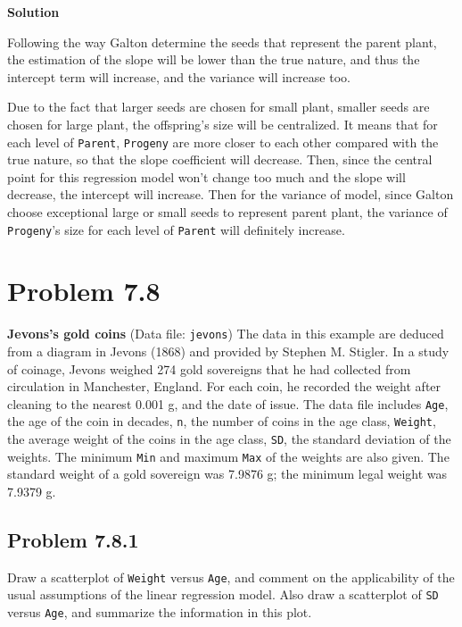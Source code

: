 \documentclass[12pt,oneside,a4paper]{article}\usepackage[]{graphicx}\usepackage[]{xcolor}
\newcommand{\problem}[1]
{
    \clearpage
    \section*{Problem {#1}}
}
\newcommand{\subproblem}[1]
{
    \subsection*{Problem {#1}}
}
\newcommand{\solution}
{
    \vspace{15pt}
    \noindent\ignorespaces\textbf{\large Solution}\par
}
\newcommand{\m}[1]{\texttt{{#1}}}
\begin{document}
\solution
Following the way Galton determine the seeds that represent the parent plant, the estimation of the slope will be lower than the true nature, and thus the intercept term will increase, and the variance will increase too. 

Due to the fact that larger seeds are chosen for small plant, smaller seeds are chosen for large plant, the offspring's size will be centralized. It means that for each level of \m{Parent}, \m{Progeny} are more closer to each other compared with the true nature, so that the slope coefficient will decrease. Then, since the central point for this regression model won't change too much and the slope will decrease, the intercept will increase. Then for the variance of model, since Galton choose exceptional large or small seeds to represent parent plant, the variance of \m{Progeny}'s size for each level of \m{Parent} will definitely increase. 

\problem{7.8}
\textbf{Jevons’s gold coins} (Data file: \m{jevons}) The data in this example are deduced from a diagram in Jevons (1868) and provided by Stephen M. Stigler. In a study of coinage, Jevons weighed 274 gold sovereigns that he had collected from circulation in Manchester, England. For each coin, he recorded the weight after cleaning to the nearest 0.001 g, and the date of issue. The data file includes \m{Age}, the age of the coin in decades, \m{n}, the number of coins in the age class, \m{Weight}, the average weight of the coins in the age class, \m{SD}, the standard deviation of the weights. The minimum \m{Min} and maximum \m{Max} of the weights are also given. The standard weight of a gold sovereign was 7.9876 g; the minimum legal weight was 7.9379 g.

\subproblem{7.8.1}
Draw a scatterplot of \m{Weight} versus \m{Age}, and comment on the applicability of the usual assumptions of the linear regression model. Also draw a scatterplot of \m{SD} versus \m{Age}, and summarize the information in this plot.
\end{document}
